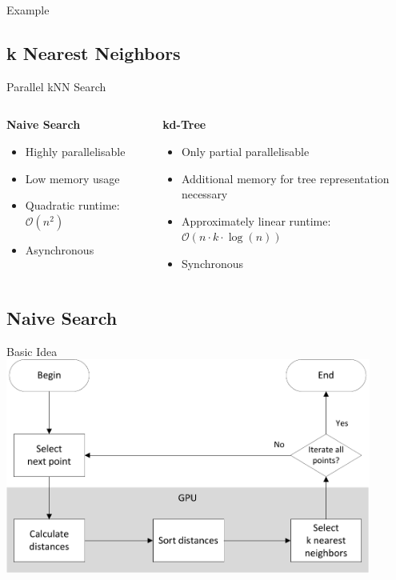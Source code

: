 \documentclass{beamer}
\begin{document}
\begin{frame}{Example}
\end{frame}

\subsection*{k Nearest Neighbors}

\begin{frame}{Parallel kNN Search}
	\begin{columns}[T]
		\begin{column}{0.5\textwidth}
			\textbf{Naive Search}
			\begin{itemize}
				\item Highly parallelisable
				\item Low memory usage
				\item Quadratic runtime: $\mathcal{O}(n^2)$
				\item Asynchronous
			\end{itemize}
		\end{column}
		\begin{column}{0.5\textwidth}
			\textbf{kd-Tree}
			\begin{itemize}
				\item Only partial parallelisable
				\item Additional memory for tree representation necessary
				\item Approximately linear runtime: \mbox{$\mathcal{O}(n \cdot k \cdot \log(n))$}
				\item Synchronous
			\end{itemize}
		\end{column}
	\end{columns}
\end{frame}

\subsection*{Naive Search}

\begin{frame}{Basic Idea}
	\centering
	\includegraphics[width=0.9\textwidth]{knn_procedure.pdf}
\end{frame}
\end{document}
